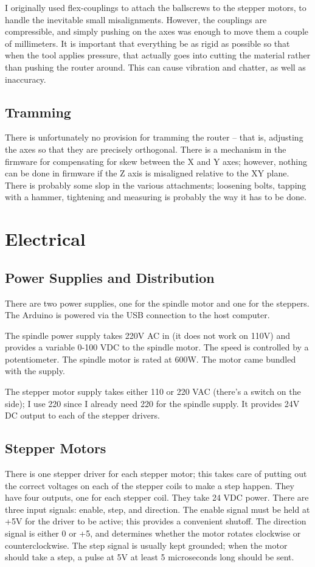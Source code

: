 \documentclass[a4paper,11pt]{article}
\begin{document}
I originally used flex-couplings to attach the ballscrews to the stepper motors, to handle the inevitable small misalignments. However, the couplings are compressible, and simply pushing on the axes was enough to move them a couple of millimeters. It is important that everything be as rigid as possible so that when the tool applies pressure, that actually goes into cutting the material rather than pushing the router around. This can cause vibration and chatter, as well as inaccuracy. 


\subsection{Tramming}
There is unfortunately no provision for tramming the router -- that is, adjusting the axes so that they are precisely orthogonal. There is a mechanism in the firmware for compensating for skew between the X and Y axes; however, nothing can be done in firmware if the Z axis is misaligned relative to the XY plane. There is probably some slop in the various attachments; loosening bolts, tapping with a hammer, tightening and measuring is probably the way it has to be done. 

\section{Electrical}
\subsection{Power Supplies and Distribution}
There are two power supplies, one for the spindle motor and one for the steppers. The Arduino is powered via the USB connection to the host computer. 

The spindle power supply takes 220V AC in (it does not work on 110V) and provides a variable 0-100 VDC to the spindle motor. The speed is controlled by a potentiometer. The spindle motor is rated at 600W. The motor came bundled with the supply.

The stepper motor supply takes either 110 or 220 VAC (there's a switch on the side); I use 220 since I already need 220 for the spindle supply. It provides 24V DC output to each of the stepper drivers.

\subsection{Stepper Motors}
There is one stepper driver for each stepper motor; this takes care of putting out the correct voltages on each of the stepper coils to make a step happen. They have four outputs, one for each stepper coil. They take 24 VDC power. There are three input signals: enable, step, and direction. The enable signal must be held at +5V for the driver to be active; this provides a convenient shutoff. The direction signal is either 0 or +5, and determines whether the motor rotates clockwise or counterclockwise. The step signal is usually kept grounded; when the motor should take a step, a pulse at 5V at least 5 microseconds long should be sent. 
\end{document}
